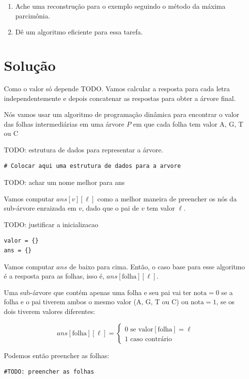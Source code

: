\documentclass[11pt]{article}
\begin{document}
\begin{enumerate}
\item Ache uma reconstrução para o exemplo seguindo o método da
máxima parcimônia.
\item Dê um algoritmo eficiente para essa tarefa.
\end{enumerate}

\section{Solução}
\label{sec-2}

Como o valor só depende TODO. Vamos calcular a resposta para cada
letra independentemente e depois concatenar as respostas para obter a
árvore final.

Nós vamos usar um algoritmo de programação dinâmica para encontrar o
valor das folhas intermediárias em uma árvore $P$ em que cada
folha tem valor A, G, T ou C

TODO: estrutura de dados para representar a árvore.
\begin{verbatim}
# Colocar aqui uma estrutura de dados para a arvore
\end{verbatim}

TODO: achar um nome melhor para ans

Vamos computar $ans[v][\ell]$ como a melhor maneira de preencher os nós
da sub-árvore enraizada em $v$, dado que o pai de $v$ tem valor $\ell$.

TODO: justificar a inicializacao
\begin{verbatim}
valor = {}
ans = {}
\end{verbatim}

Vamos computar $ans$ de baixo para cima. Então, o caso base para esse algoritmo
é a resposta para as folhas, isso é, $ans[\mathrm{folha}][\ell]$.

Uma sub-árvore que contém apenas uma folha e seu pai vai ter
$\mathrm{nota} = 0$ se a folha e o pai tiverem ambos o mesmo valor (A,
G, T ou C) ou $\mathrm{nota} = 1$, se os dois tiverem valores diferentes:

\[ans[\mathrm{folha}][\ell] = \begin{cases}0 \text{ se } \mathrm{valor}[\mathrm{folha}] = \ell \\
                                                     1 \text{ caso contrário}\end{cases}\]

Podemos então preencher as folhas:
\begin{verbatim}
#TODO: preencher as folhas
\end{verbatim}
\end{document}
